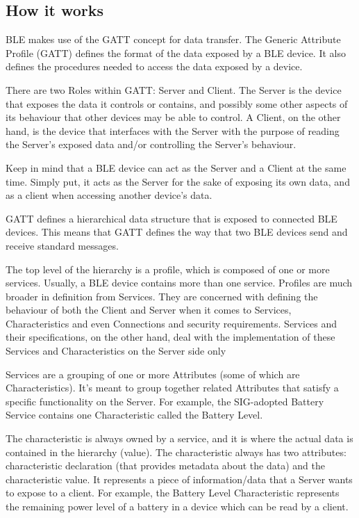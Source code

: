 \subsection{How it works}

BLE makes use of the GATT concept for data transfer.
The Generic Attribute Profile (GATT) defines the format of the data exposed by a BLE device. It also defines the procedures needed to access the data exposed by a device.

There are two Roles within GATT: Server and Client. The Server is the device that exposes the data it controls or contains, and possibly some other aspects of its behaviour that other devices may be able to control. A Client, on the other hand, is the device that interfaces with the Server with the purpose of reading the Server’s exposed data and/or controlling the Server’s behaviour.

Keep in mind that a BLE device can act as the Server and a Client at the same time. Simply put, it acts as the Server for the sake of exposing its own data, and as a client when accessing another device’s data.

GATT defines a hierarchical data structure that is exposed to connected BLE devices. This means that GATT defines the way that two BLE devices send and receive standard messages.

The top level of the hierarchy is a profile, which is composed of one or more services. Usually, a BLE device contains more than one service. Profiles are much broader in definition from Services. They are concerned with defining the behaviour of both the Client and Server when it comes to Services, Characteristics and even Connections and security requirements. Services and their specifications, on the other hand, deal with the implementation of these Services and Characteristics on the Server side only

Services are a grouping of one or more Attributes (some of which are Characteristics). It’s meant to group together related Attributes that satisfy a specific functionality on the Server. For example, the SIG-adopted Battery Service contains one Characteristic called the Battery Level.

The characteristic is always owned by a service, and it is where the actual data is contained in the hierarchy (value). The characteristic always has two attributes: characteristic declaration (that provides metadata about the data) and the characteristic value. It represents a piece of information/data that a Server wants to expose to a client. For example, the Battery Level Characteristic represents the remaining power level of a battery in a device which can be read by a client.

